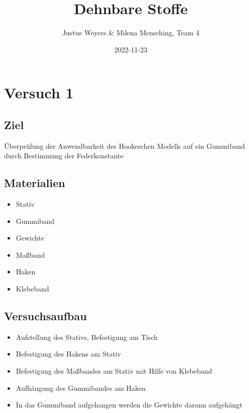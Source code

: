 \documentclass[
  9pt,
]{article}
\title{Dehnbare Stoffe}
\author{Justus Weyers \& Milena Mensching, Team 4}
\date{2022-11-23}
\providecommand{\tightlist}{%
  \setlength{\itemsep}{0pt}\setlength{\parskip}{0pt}}
\begin{document}
\maketitle

\hypertarget{versuch-1}{%
\section{Versuch 1}\label{versuch-1}}

\hypertarget{ziel}{%
\subsection{Ziel}\label{ziel}}

Überprüfung der Anwendbarkeit des Hookeschen Modells auf ein Gummiband
durch Bestimmung der Federkonstante

\hypertarget{materialien}{%
\subsection{Materialien}\label{materialien}}

\begin{itemize}
\tightlist
\item
  Stativ
\item
  Gummiband
\item
  Gewichte
\item
  Maßband
\item
  Haken
\item
  Klebeband
\end{itemize}

\hypertarget{versuchsaufbau}{%
\subsection{Versuchsaufbau}\label{versuchsaufbau}}

\begin{itemize}
\tightlist
\item
  Aufstellung des Stativs, Befestigung am Tisch
\item
  Befestigung des Hakens am Stativ
\item
  Befestigung des Maßbandes am Stativ mit Hilfe von Klebeband
\item
  Aufhängung des Gummibandes am Haken
\item
  In das Gummiband aufgehangen werden die Gewichte darann aufgehängt
\end{itemize}
\end{document}
